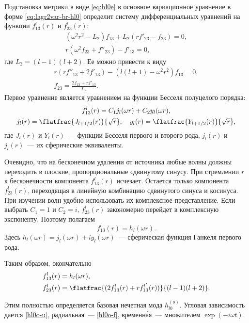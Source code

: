 \documentclass[\docroot/reports/draft/report.tex]{subfiles}
\begin{document}
    Подстановка метрики в виде \autoref{eq:hl0e} в основное вариационное уравнение в форме \autoref{eq:lagr2var-br-hl0} определит систему дифференциальных уравнений на функции $f^l_{13}(r)$ и $f^l_{23}(r)$:
    \begin{equation*}\begin{gathered}
        (\omega^2 r^2 - L_2) f_{13} + L_2 (r f'_{23} - f_{23}) = 0, \\
        r (\omega^2 f_{23} + f''_{23}) - f'_{13} = 0,
    \end{gathered}\end{equation*}
    где $L_2 = (l-1)(l+2)$. Ее можно привести к виду
    \begin{equation*}\begin{gathered}
        r (r f''_{13} + 2 f'_{13}) - (l(l+1) - \omega^2 r^2) f_{13} = 0, \\
        f_{23} = \frac{2 f_{13} + r f'_{13}}{L_2}.
    \end{gathered}\end{equation*}
    Первое уравнение является уравнением на функции Бесселя полуцелого порядка:
    \begin{equation*}\begin{gathered}
        f^l_{13}(r) = C_1 j_l(\omega r) + C_2 y_l(\omega r), \\
        j_l(r) = \flatfrac{J_{l+1/2}(r)}{\sqrt{r}}, \quad
        y_l(r) = \flatfrac{Y_{l+1/2}(r)}{\sqrt{r}},
    \end{gathered}\end{equation*}
    где $J_l(r)$ и $Y_l(r)$~--- функции Бесселя первого и второго рода, $j_l(r)$ и $j_l(r)$~--- их сферические эквиваленты.

    Очевидно, что на бесконечном удалении от источника любые волны должны переходить в плоские, пропорциональные сдвинутому синусу. При стремлении $r$ к бесконечности компонента $f^l_{13}(r)$ исчезает. Остается только компонента $f^l_{23}(r)$, переходящая в линейную комбинацию сдвинутого синуса и косинуса. При изучении волн удобно использовать их комплексное представление. Если выбрать $C_1 = 1$ и $C_2 = i$, $f^l_{23}(r)$ закономерно перейдет в комплексную экспоненту. Поэтому полагаем
    \begin{equation*}
        f^l_{13}(r) = h_l(\omega r).
    \end{equation*}
    Здесь $h_l(\omega r) = j_l(\omega r) + i y_l(\omega r)$~--- сферическая функция Ганкеля первого рода.

    Таким образом, окончательно
    \begin{equation}\begin{aligned}\label{hl0o-f}
        f^l_{13}(r) &= h_l(\omega r), \\
        f^l_{23}(r) &= \flatfrac{(2 f^l_{13}(r) + r f^{l{'}}_{13}(r))}{(l-1)(l+2)}.
    \end{aligned}\end{equation}

    Этим полностью определяется базовая нечетная мода $h^{(o)}_{l0}$. Угловая зависимость дается \autoref{hl0o-u}, радиальная~--- \autoref{hl0o-f}, временн\'{а}я~--- множителем $\exp(-i \omega t)$.
\end{document}
